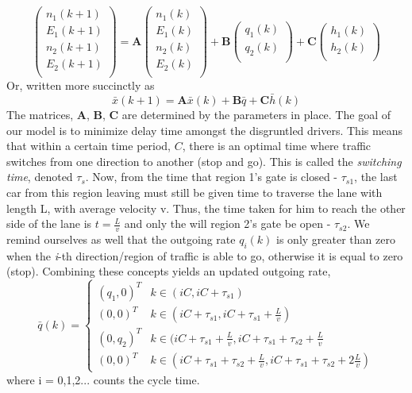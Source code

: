 \documentclass[a4paper]{article}
\begin{document}
\[
\begin{pmatrix}
n_1 (k+1) \\
E_1 (k+1) \\
n_2 (k+1) \\
E_2 (k+1) \\
\end{pmatrix}
= \textbf{A} \begin{pmatrix}
n_1 (k) \\
E_1 (k) \\
n_2 (k) \\
E_2 (k) \\
\end{pmatrix}
+\textbf{B} \begin{pmatrix}
q_1 (k) \\
q_2 (k) \\
\end{pmatrix}
+\textbf{C} \begin{pmatrix}
h_1 (k) \\
h_2 (k) \\
\end{pmatrix}
\]
Or, written more succinctly as 
\begin{equation}
\bar{x} (k+1) = \textbf{A}\bar{x}(k) +\textbf{B}\bar{q} +\textbf{C}\bar{h}(k)
\label{num}
\end{equation}
The matrices, \textbf{A}, \textbf{B}, \textbf{C} are determined by the parameters in place. The goal of our model is to minimize delay time amongst the disgruntled drivers. This means that within a certain time period, $C$, there is an optimal time where traffic switches from one direction to another (stop and go). This is called the \textit{switching time}, denoted $\tau_s$. Now, from the time that region 1's gate is closed - $\tau_{s1}$, the last car from this region leaving must still be given time to traverse the lane with length L, with average velocity v. Thus, the time taken for him to reach the other side of the lane is $t = \frac{L}{v}$ and only the will region 2's gate be open - $\tau_{s2}$. We remind ourselves as well that the outgoing rate $q_i (k)$ is only greater than zero when the \textit{i}-th direction/region of traffic is able to go, otherwise it is equal to zero (stop). Combining these concepts yields an updated outgoing rate,
\[\bar{q}(k) = \begin{cases}
(q_1 , 0)^T & k\in (iC, iC+\tau_{s1}) \\
(0,0) ^T & k \in (iC+\tau_{s1}, iC+\tau_{s1} + \frac{L}{v}) \\
(0, q_2)^T & k \in (iC+\tau_{s1} + \frac{L}{v}, iC+\tau_{s1} + \tau_{s2} + \frac{L}{v} \\
(0,0)^T  & k \in (iC+\tau_{s1} + \tau_{s2} + \frac{L}{v}, iC+\tau_{s1} + \tau_{s2} + 2\frac{L}{v})
\end{cases}
\]
where i = 0,1,2... counts the cycle time.
\end{document}
